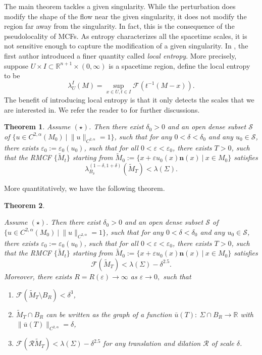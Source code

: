 \documentclass[12pt]{amsart}
\numberwithin{equation}{section}
\newtheorem{theorem}{Theorem}[section]
\numberwithin{equation}{section}
\newcommand{\eps}{\varepsilon}
\newcommand{\dt}{\delta}
\newcommand{\al}{\alpha}
\newcommand{\cS}{\mathcal{S}}
\newcommand{\cR}{\mathcal{R}}
\newcommand{\cF}{\mathcal{F}}
\newcommand{\R}{\mathbb{R}}
\begin{document}
	
	The main theorem tackles a given singularity. While the perturbation does modify the shape of the flow near the given singularity, it does not modify the region far away from the singularity. In fact, this is the consequence of the pseudolocality of MCFs. As entropy characterizes all the spacetime scales, it is not sensitive enough to capture the modification of a given singularity. In \cite{Su}, the first author introduced a finer quantity called \emph{local entropy}. More precisely, suppose $U\times I\subset\R^{n+1}\times(0,\infty)$ is a spacetime region,  define the local entropy to be
	\[
	\lambda^I_U(M)=\sup_{x\in U,t\in I}\cF(t^{-1}(M-x)).
	\]
	The benefit of introducing local entropy is that it only detects the scales that we are interested in. We refer the reader to \cite{Su} for further discussions.
	
	\begin{theorem}\label{thm:MainThmLocal}
		Assume $(\star)$. Then there exist $\dt_0>0$ and   an open dense subset $\cS$ of $\{u\in C^{2,\alpha}(M_0)\ |\ \|u\|_{C^{2,\alpha}}=1\}$, such that for any $0<\dt<\dt_0$ and any $u_0\in \mathcal S$, there exists $\eps_0:=\eps_0(u_0)$, such that for all $0<\eps<\eps_0$, there exists $T>0$, such that the RMCF $\{\widetilde{M}_t\}$ starting from $\widetilde{M}_0:=\{x+\eps u_0(x)\mathbf n(x)\ |\ x\in M_0\}$ satisfies $$\lambda^{(1-\delta,1+\delta)}_{B_\delta}(\widetilde{M}_T)<\lambda(\Sigma).$$
	\end{theorem}
	
	More quantitatively, we have the following theorem. 
	\begin{theorem}\label{thm:main1}
		
		Assume $(\star)$. Then there exist $\dt_0>0$ and   an open dense subset $\cS$ of $\{u\in C^{2,\alpha}(M_0)\ |\ \|u\|_{C^{2,\alpha}}=1\}$, such that for any $0<\dt<\dt_0$ and any $u_0\in \mathcal S$, there exists $\eps_0:=\eps_0(u_0)$, such that for all $0<\eps<\eps_0$, there exists $T>0$, such that the RMCF $\{\widetilde{M}_t\}$ starting from $\widetilde{M}_0:=\{x+\eps u_0(x)\mathbf n(x)\ |\ x\in M_0\}$ satisfies $$\cF( \widetilde{M}_T)<\lambda(\Sigma)-\dt^{2.5}.$$
		Moreover, there exists $R=R(\eps)\to\infty$ as $\eps\to 0,$ such that \begin{enumerate}
			\item $\cF(\widetilde{M}_T\setminus B_R)<\dt^3$,
			\item  $\widetilde{M}_T\cap B_R$ can be written as the graph of a function $\bar u(T):\ \Sigma\cap B_R\to \R$ with $\|\bar u(T)\|_{C^{2,\al}}=\dt$,
			\item $\cF(\mathcal R \widetilde{M}_T)<\lambda(\Sigma)-\dt^{2.5}$ for any translation and dilation $\cR$ of scale $\dt$.
		\end{enumerate}
		
		
	\end{theorem}
	
\end{document}

